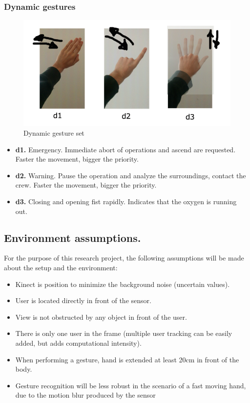 \documentclass[a4paper,11pt,oneside]{article}
\begin{document}
    \subsubsection{Dynamic gestures}
    
  \begin{figure}[H]
  \centering
  \includegraphics[scale=0.5]{dynamic-gestureset.png}
  \caption{Dynamic gesture set}
  \end{figure}
  
  \begin{itemize}
    \item \textbf{d1.} Emergency. Immediate abort of operations and ascend are requested. Faster the movement, bigger the priority.
    \item \textbf{d2.} Warning. Pause the operation and analyze the surroundings, contact the crew. Faster the movement, bigger the priority.
    \item \textbf{d3.} Closing and opening fist rapidly. Indicates that the oxygen is running out.
    \end{itemize}

\subsection{Environment assumptions.}

  For the purpose of this research project, the following assumptions will be made about the setup and the environment:\\
  
  \begin{itemize}
 \item Kinect is position to minimize the background noise (uncertain values).
  \item User is located directly in front of the sensor.
  \item View is not obstructed by any object in front of the user.
  \item There is only one user in the frame (multiple user tracking can be easily added, but adds computational intensity).
  \item When performing a gesture, hand is extended at least 20cm in front of the body.
\item Gesture recognition will be less robust in the scenario of a fast moving hand, due to the motion blur produced by the sensor
  \end{itemize}
\end{document}
